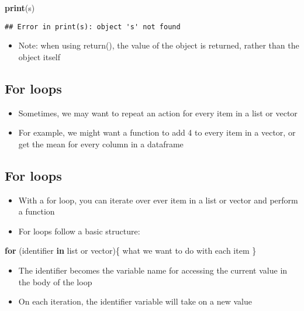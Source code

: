 \documentclass[]{article}
\newenvironment{Shaded}{\begin{snugshade}}{\end{snugshade}}
\newcommand{\KeywordTok}[1]{\textcolor[rgb]{0.13,0.29,0.53}{\textbf{#1}}}
\newcommand{\ControlFlowTok}[1]{\textcolor[rgb]{0.13,0.29,0.53}{\textbf{#1}}}
\newcommand{\NormalTok}[1]{#1}
\providecommand{\tightlist}{%
  \setlength{\itemsep}{0pt}\setlength{\parskip}{0pt}}
\begin{document}
\begin{Shaded}
\begin{Highlighting}[]
\KeywordTok{print}\NormalTok{(s)}
\end{Highlighting}
\end{Shaded}

\begin{verbatim}
## Error in print(s): object 's' not found
\end{verbatim}

\begin{itemize}
\tightlist
\item
  Note: when using return(), the value of the object is returned, rather
  than the object itself
\end{itemize}

\subsection{For loops}\label{for-loops}

\begin{itemize}
\tightlist
\item
  Sometimes, we may want to repeat an action for every item in a list or
  vector
\item
  For example, we might want a function to add 4 to every item in a
  vector, or get the mean for every column in a dataframe
\end{itemize}

\subsection{For loops}\label{for-loops-1}

\begin{itemize}
\tightlist
\item
  With a for loop, you can iterate over ever item in a list or vector
  and perform a function
\item
  For loops follow a basic structure:
\end{itemize}

\begin{Shaded}
\begin{Highlighting}[]
\ControlFlowTok{for}\NormalTok{ (identifier }\ControlFlowTok{in}\NormalTok{ list or vector)\{}
\NormalTok{  what we want to do with each item}
\NormalTok{\}}
\end{Highlighting}
\end{Shaded}

\begin{itemize}
\tightlist
\item
  The identifier becomes the variable name for accessing the current
  value in the body of the loop
\item
  On each iteration, the identifier variable will take on a new value
\end{itemize}
\end{document}
